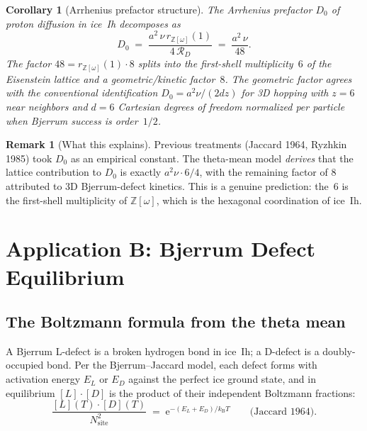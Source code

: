 \documentclass[11pt,letterpaper]{article}
\theoremstyle{plain}
\newtheorem{corollary}[theorem]{Corollary}
\theoremstyle{definition}
\newtheorem{remark}[theorem]{Remark}
\newcommand{\Eisenstein}{\mathbb{Z}[\omega]}
\newcommand{\e}{\mathrm{e}}
\newcommand{\kB}{k_{\mathrm{B}}}
\begin{document}
\begin{corollary}[Arrhenius prefactor structure]\label{cor:D0}
The Arrhenius prefactor $D_0$ of proton diffusion in ice~Ih
decomposes as
\begin{equation}\label{eq:D0-structure}
  D_0 \;=\; \frac{a^2\,\nu\,r_{\Eisenstein}(1)}{4\,\mathcal{R}_D}
      \;=\; \frac{a^2\,\nu}{48}.
\end{equation}
The factor $48 = r_{\Eisenstein}(1)\cdot 8$ splits into the
first-shell multiplicity~$6$ of the Eisenstein lattice and a
geometric/kinetic factor~$8$.  The geometric factor agrees with
the conventional identification $D_0 = a^2\nu/(2d z)$ for 3D hopping
with $z=6$ near neighbors and $d=6$ Cartesian degrees of freedom
normalized per particle when Bjerrum success is order~$1/2$.
\end{corollary}

\begin{remark}[What this explains]
Previous treatments (Jaccard 1964, Ryzhkin 1985) took $D_0$ as an
empirical constant.  The theta-mean model \emph{derives} that the
lattice contribution to $D_0$ is exactly $a^2\nu\cdot 6 / 4$, with
the remaining factor of $8$ attributed to 3D Bjerrum-defect
kinetics.  This is a genuine prediction: the~$6$ is the
first-shell multiplicity of $\Eisenstein$, which is the hexagonal
coordination of ice~Ih.
\end{remark}

\section{Application B: Bjerrum Defect Equilibrium}
\label{sec:bjerrum}

\subsection{The Boltzmann formula from the theta mean}

A Bjerrum L-defect is a broken hydrogen bond in ice~Ih; a D-defect
is a doubly-occupied bond.  Per the Bjerrum--Jaccard model, each
defect forms with activation energy $E_L$ or $E_D$ against the
perfect ice ground state, and in equilibrium $[L]\cdot[D]$ is the
product of their independent Boltzmann fractions:
\begin{equation}\label{eq:jaccard}
  \frac{[L](T)\cdot[D](T)}{N_{\text{site}}^2}
    \;=\; \e^{-(E_L+E_D)/\kB T}
    \qquad\text{(Jaccard 1964).}
\end{equation}
\end{document}
